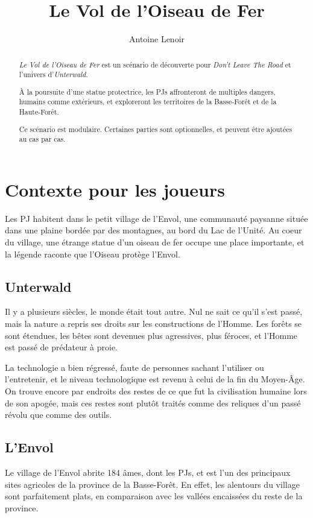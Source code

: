 \documentclass[a4paper,10pt,twoside,twocolumn,openany,bg=print,justified]{dndarticle}
\title{Le Vol de l'Oiseau de Fer}
\author{Antoine Lenoir}
\begin{document}
\maketitle

\begin{abstract}
\emph{Le Vol de l'Oiseau de Fer} est un scénario de découverte pour \emph{Don't Leave The Road} et l'univers d'\emph{Unterwald}. 

À la poursuite d'une statue protectrice, les PJs affronteront de multiples dangers, humains comme extérieurs, et exploreront les territoires de la Basse-Forêt et de la Haute-Forêt.

Ce scénario est modulaire. Certaines parties sont optionnelles, et peuvent être ajoutées au cas par cas.
\end{abstract}

\section{Contexte pour les joueurs}

Les PJ habitent dans le petit village de l'Envol, une communauté paysanne située dans une plaine bordée par des montagnes, au bord du Lac de l'Unité. Au coeur du village, une étrange statue d'un oiseau de fer occupe une place importante, et la légende raconte que l'Oiseau protège l'Envol.

\subsection{Unterwald}

Il y a plusieurs siècles, le monde était tout autre. Nul ne sait ce qu'il s'est passé, mais la nature a repris ses droits sur les constructions de l'Homme. Les forêts se sont étendues, les bêtes sont devenues plus agressives, plus féroces, et l'Homme est passé de prédateur à proie.

La technologie a bien régressé, faute de personnes sachant l'utiliser ou l'entretenir, et le niveau technologique est revenu à celui de la fin du Moyen-Âge. On trouve encore par endroits des restes de ce que fut la civilisation humaine lors de son apogée, mais ces restes sont plutôt traités comme des reliques d'un passé révolu que comme des outils.

\subsection{L'Envol}

Le village de l'Envol abrite 184 âmes, dont les PJs, et est l'un des principaux sites agricoles de la province de la Basse-Forêt. En effet, les alentours du village sont parfaitement plats, en comparaison avec les vallées encaissées du reste de la province.
\end{document}
